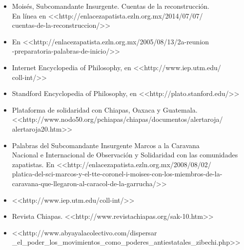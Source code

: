 \documentclass[oneside]{book}
\begin{document}
\begin{itemize}
\item Moisés, Subcomandante Insurgente. Cuentas de la reconstrucción. \\ En línea en <<http://enlacezapatista.ezln.org.mx/2014/07/07/ \\ cuentas-de-la-reconstruccion/>> 
\item En <<http://enlacezapatista.ezln.org.mx/2005/08/13/2a-reunion\\ -preparatoria-palabras-de-inicio/>>
\item Internet Encyclopedia of Philosophy, en <<http://www.iep.utm.edu/\\ coll-int/>>
\item Standford Encyclopedia of Philosophy, en  <<http://plato.stanford.edu/>>
\item Plataforma de solidaridad con Chiapas, Oaxaca y Guatemala.\\  <<http://www.nodo50.org/pchiapas/chiapas/documentos/alertaroja/ \\alertaroja20.htm>>
\item Palabras del Subcomandante Insurgente Marcos a la Caravana \\ Nacional e Internacional de Observación y Solidaridad con las comunidades zapatistas. En <<http://enlacezapatista.ezln.org.mx/2008/08/02/\\ platica-del-sci-marcos-y-el-tte-coronel-i-moises-con-los-miembros-de-la-\\ caravana-que-llegaron-al-caracol-de-la-garrucha/>>
\item <<http://www.iep.utm.edu/coll-int/>>
\item Revista Chiapas. <<http://www.revistachiapas.org/sak-10.htm>>
\item <<http://www.abyayalacolectivo.com/dispersar\\ \_el\_poder\_los\_movimientos\_como\_poderes\_antiestatales\_zibechi.php>>
\end{itemize}
\end{document}

